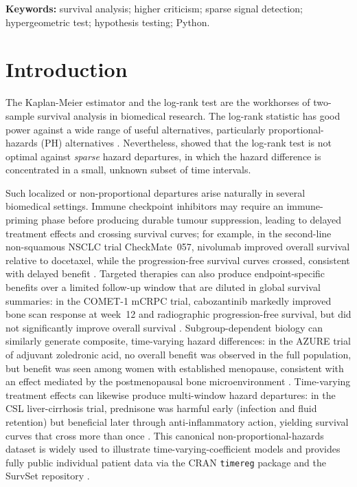 \documentclass[11pt]{article}
\begin{document}
\noindent\textbf{Keywords:} survival analysis; higher criticism; sparse
signal detection; hypergeometric test; hypothesis testing; Python.

\vspace{1em}
\section{Introduction}

The Kaplan-Meier estimator \citep{kaplan1958} and the log-rank test
\citep{mantel1966} are the workhorses of two-sample survival analysis in
biomedical research. The log-rank statistic has good power against a wide
range of useful alternatives, particularly proportional-hazards (PH)
alternatives \citep{schoenfeld1981}. Nevertheless,
\citet{kipnis_biometrika} showed that the log-rank test is not optimal
against \emph{sparse} hazard departures, in which the hazard difference is
concentrated in a small, unknown subset of time intervals.

Such localized or non-proportional departures arise naturally in several
biomedical settings. Immune checkpoint inhibitors may require an
immune-priming phase before producing durable tumour suppression, leading
to delayed treatment effects and crossing survival curves; for example,
in the second-line non-squamous NSCLC trial CheckMate~057, nivolumab
improved overall survival relative to docetaxel, while the
progression-free survival curves crossed, consistent with delayed benefit
\citep{borghaei2015}. Targeted therapies can also produce endpoint-specific
benefits over a limited follow-up window that are diluted in global
survival summaries: in the COMET-1 mCRPC trial, cabozantinib markedly
improved bone scan response at week~12 and radiographic
progression-free survival, but did not significantly improve overall
survival \citep{smith2016}. Subgroup-dependent biology can similarly
generate composite, time-varying hazard differences: in the AZURE trial
of adjuvant zoledronic acid, no overall benefit was observed in the full
population, but benefit was seen among women with established menopause,
consistent with an effect mediated by the postmenopausal bone
microenvironment \citep{coleman2011,coleman2014}.
Time-varying treatment effects can likewise produce multi-window hazard
departures: in the CSL liver-cirrhosis trial, prednisone was harmful early
(infection and fluid retention) but beneficial later through
anti-inflammatory action, yielding survival curves that cross more than once
\citep{csl_data}. This canonical non-proportional-hazards dataset is widely
used to illustrate time-varying-coefficient models and provides fully public
individual patient data via the CRAN \texttt{timereg} package
\citep{csl_data} and the SurvSet repository \citep{survset2022}.
\end{document}

